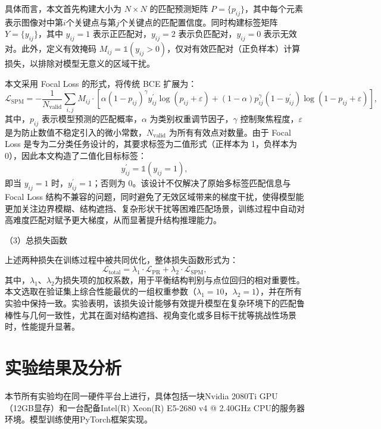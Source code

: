 具体而言，本文首先构建大小为 $N \times N$ 的匹配预测矩阵 $P=\{p_{ij}\}$，其中每个元素表示图像对中第$i$个关键点与第$j$个关键点的匹配置信度。同时构建标签矩阵 $Y=\{y_{ij}\}$，其中 $y_{ij}=1$ 表示正匹配对，$y_{ij}=2$ 表示负匹配对，$y_{ij}=0$ 表示无效对。此外，定义有效掩码 $M_{ij}=\mathbb{1}\left(y_{ij}>0\right)$，仅对有效匹配对（正负样本）计算损失，以排除对模型无意义的区域干扰。

本文采用 Focal Loss\cite{lin2017focal} 的形式，将传统 BCE 扩展为：
\begin{equation}
    \mathcal{L}_\mathrm{SPM}=-\frac{1}{N_{\mathrm{valid}}}\sum_{i,j} M_{ij}\cdot\left[\alpha\left(1-p_{ij}\right)^\gamma y_{ij}^\prime\log{\left(p_{ij}+\varepsilon\right)}+(1 -\alpha) p_{ij}^\gamma\left(1-y_{ij}^\prime\right)\log{\left(1-p_{ij}+\varepsilon\right)}\right],
\end{equation}
其中，$p_{ij}$ 表示模型预测的匹配概率，$\alpha$ 为类别权重调节因子，$\gamma$ 控制聚焦程度，$\varepsilon$ 是为防止数值不稳定引入的微小常数，$N_{\mathrm{valid}}$ 为所有有效点对数量。由于 Focal Loss 是专为二分类任务设计的，其要求标签为二值形式（正样本为 1，负样本为 0），因此本文构造了二值化目标标签：
\begin{equation}
    y_{ij}^\prime=\mathbb{1}\left(y_{ij}=1\right),
\end{equation}
即当 $y_{ij}=1$ 时，$y_{ij}^\prime = 1$；否则为 0。该设计不仅解决了原始多标签匹配信息与 Focal Loss 结构不兼容的问题，同时避免了无效区域带来的梯度干扰，使得模型能更加关注边界模糊、结构遮挡、复杂形状干扰等困难匹配场景，训练过程中自动对高难度匹配对赋予更大梯度，从而显著提升结构推理能力。

（3）总损失函数

上述两种损失在训练过程中被共同优化，整体损失函数形式为：
\begin{equation}
    \mathcal{L}_\mathrm{total}=\lambda_1\cdot\mathcal{L}_\mathrm{PR}+\lambda_2\cdot\mathcal{L}_\mathrm{SPM},
\end{equation}
其中，$\lambda_1$、$\lambda_2$为损失项的加权系数，用于平衡结构判别与点位回归的相对重要性。本文选取在验证集上综合性能最优的一组权重参数（$\lambda_1 = 10$，$\lambda_2 = 1$），并在所有实验中保持一致。实验表明，该损失设计能够有效提升模型在复杂环境下的匹配鲁棒性与几何一致性，尤其在面对结构遮挡、视角变化或多目标干扰等挑战性场景时，性能提升显著。

\section{实验结果及分析}
本节所有实验均在同一硬件平台上进行，具体包括一块Nvidia 2080Ti GPU（12GB显存）和一台配备Intel(R) Xeon(R) E5-2680 v4 @ 2.40GHz CPU的服务器环境。模型训练使用PyTorch框架实现。

